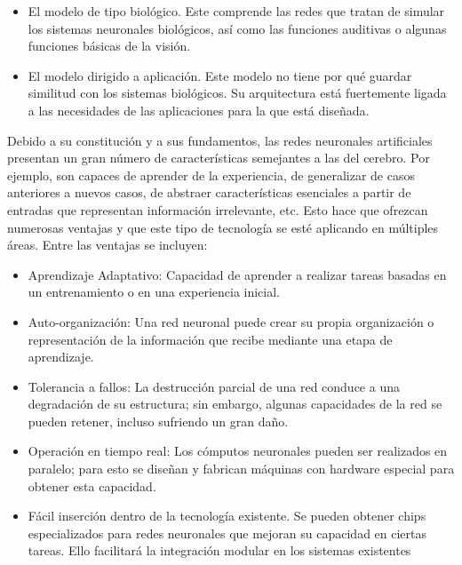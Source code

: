     \begin{itemize}
        \item El modelo de tipo biológico. Este comprende las redes que tratan de simular los sistemas neuronales biológicos, así como las funciones auditivas o algunas funciones básicas de la visión.
        \item El modelo dirigido a aplicación. Este modelo no tiene por qué guardar similitud con los sistemas biológicos. Su arquitectura está fuertemente ligada a las necesidades de las aplicaciones para la que está diseñada.
    
    \end{itemize}
    
    Debido a su constitución y a sus fundamentos, las redes neuronales artificiales presentan un gran número de características semejantes a las del cerebro. Por ejemplo, son capaces de aprender de la experiencia, de generalizar de casos anteriores a nuevos casos, de abstraer características esenciales a partir de entradas que representan información irrelevante, etc. Esto hace que ofrezcan numerosas ventajas y que este tipo de tecnología se esté aplicando en múltiples áreas. Entre las ventajas se incluyen: 
    \begin{itemize}
        \item Aprendizaje Adaptativo: Capacidad de aprender a realizar tareas basadas en un entrenamiento o en una experiencia inicial. 
        \item Auto-organización: Una red neuronal puede crear su propia organización o representación de la información que recibe mediante una etapa de aprendizaje.
        \item Tolerancia a fallos: La destrucción parcial de una red conduce a una degradación de su estructura; sin embargo, algunas capacidades de la red se pueden retener, incluso sufriendo un gran daño.
        \item Operación en tiempo real: Los cómputos neuronales pueden ser realizados en paralelo; para esto se diseñan y fabrican máquinas con hardware especial para obtener esta capacidad.
        \item Fácil inserción dentro de la tecnología existente. Se pueden obtener chips especializados para redes neuronales que mejoran su capacidad en ciertas tareas. Ello facilitará la integración modular en los sistemas existentes
    \end{itemize}
    
